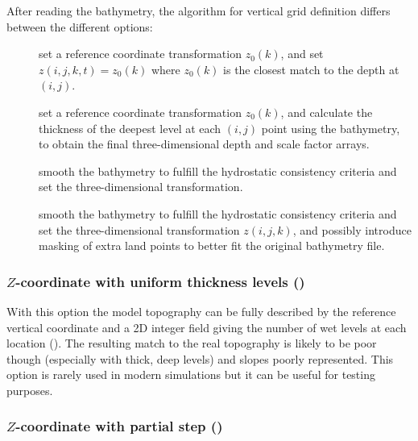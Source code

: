 \documentclass[../main/NEMO_manual]{subfiles}
\begin{document}
After reading the bathymetry, the algorithm for vertical grid definition differs between the different options:
\begin{description}
\item [] set a reference coordinate transformation $z_0(k)$, and set $z(i,j,k,t) = z_0(k)$ where $z_0(k)$ is the closest match to the depth at $(i,j)$.
\item [] set a reference coordinate transformation $z_0(k)$, and calculate the thickness of the deepest level at
  each $(i,j)$ point using the bathymetry, to obtain the final three-dimensional depth and scale factor arrays.
\item [] smooth the bathymetry to fulfill the hydrostatic consistency criteria and
  set the three-dimensional transformation.
\item [] smooth the bathymetry to fulfill the hydrostatic consistency criteria and
  set the three-dimensional transformation $z(i,j,k)$,
  and possibly introduce masking of extra land points to better fit the original bathymetry file.
\end{description}

\subsubsection[$Z$-coordinate with uniform thickness levels (\forcode{ln_zco})]{$Z$-coordinate with uniform thickness levels (\protect{})}
\label{subsec:DOMCFG_zco}

With this option the model topography can be fully described by the reference vertical
coordinate and a 2D integer field giving the number of wet levels at each location
(). The resulting match to the real topography is likely to be poor
though (especially with thick, deep levels) and slopes poorly represented. This option is
rarely used in modern simulations but it can be useful for testing purposes.

\subsubsection[$Z$-coordinate with partial step (\forcode{ln_zps})]{$Z$-coordinate with partial step (\protect{})}
\label{subsec:DOMCFG_zps}
\end{document}
